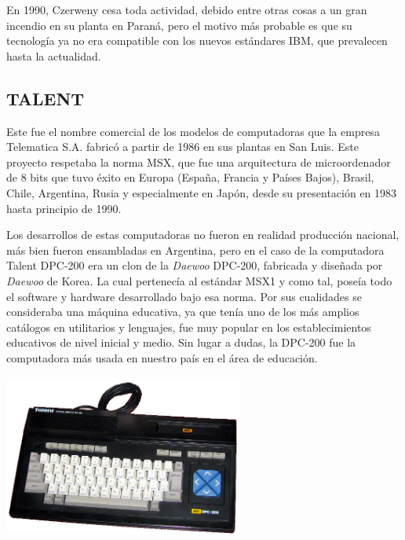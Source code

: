 \documentclass[%
  	final,
%
	notitlepage,
	narroweqnarray,
	inline,
 	twoside,
	]{ieee}
\begin{document}

En 1990, Czerweny cesa toda actividad, debido entre otras cosas a un gran incendio en su planta en Paran\'a, pero el motivo m\'as probable es que su tecnolog\'ia ya no era compatible con los nuevos est\'andares IBM, que prevalecen hasta la actualidad.

\subsection*{TALENT}

Este fue el nombre comercial de los modelos de computadoras que la empresa Telematica S.A. fabric\'o a partir de 1986 en sus plantas en San Luis. Este proyecto respetaba la norma MSX\cite{msx}, que fue una arquitectura de microordenador de 8 bits que tuvo \'exito en Europa (Espa\~na, Francia y Pa\'ises Bajos), Brasil, Chile, Argentina, Rusia y especialmente en Jap\'on, desde su presentaci\'on en 1983 hasta principio de 1990.

Los desarrollos de estas computadoras no fueron en realidad producci\'on nacional, m\'as bien fueron ensambladas en Argentina, pero en el caso de la computadora Talent DPC-200\cite{talent200} era un clon de la \textit{Daewoo} DPC-200, fabricada y dise\~nada por \textit{Daewoo} de Korea. La cual pertenec\'ia al est\'andar MSX1 y como tal, pose\'ia todo el software y hardware desarrollado bajo esa norma.
Por sus cualidades se consideraba una m\'aquina educativa, ya que ten\'ia uno de los m\'as amplios cat\'alogos en utilitarios y lenguajes, fue muy popular en los establecimientos educativos de nivel inicial y medio. Sin lugar a dudas, la DPC-200 fue la computadora m\'as usada en nuestro pa\'is en el \'area de educaci\'on.

\begin{center}\includegraphics[width=224pt, height=150pt]{talent.png}\end{center}
\end{document}
